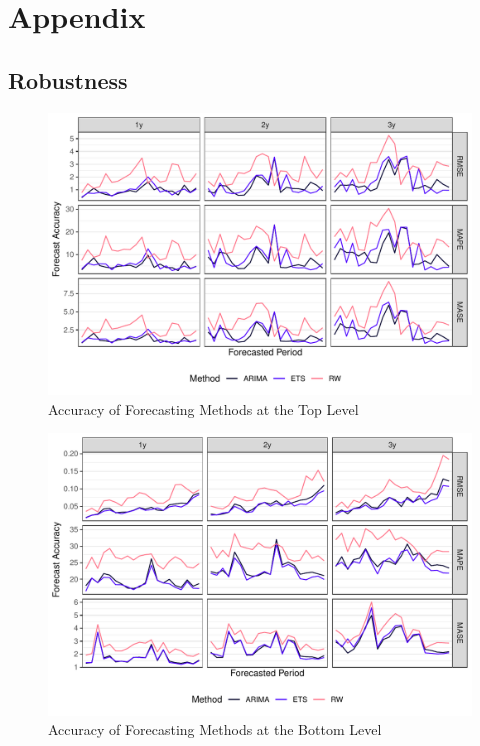 
\appendix
\section{Appendix}


\subsection{Robustness}

\begin{figure}[H]
	\includegraphics[width=\textwidth]{fig/fig_eval_methods_top}
	\caption{Accuracy of Forecasting Methods at the Top Level}
\end{figure}

\begin{figure}[H]
	\includegraphics[width=\textwidth]{fig/fig_eval_methods_bottom}
	\caption{Accuracy of Forecasting Methods at the Bottom Level}
\end{figure}


